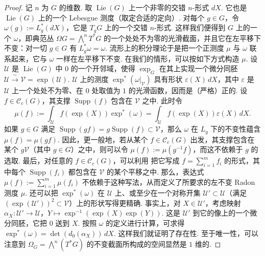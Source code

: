 \begin{proof}
记 $n$ 为 $G$ 的维数. 取 $\operatorname{Lie}(G)$ 上一个非零的交错 $n$-形式 $dX$. 它也是 $\operatorname{Lie}(G)$ 上的一个 Lebesgue 测度（取定合适的定向）. 对每个 $g\in G$，令 $\omega(g):=L_g^{*}(dX)$，它是 $T_gG$ 上的一个交错 $n$-形式. 这样我们便得到 $G$ 上的一个  $\omega$，即典范丛 $\Omega G=\bigwedge^{n}T^{*}G$ 的一个处处不为零的光滑截面，并且它在左平移下不变：对一切 $g\in G$ 有 $L_g^{*}\omega=\omega$. 流形上的积分理论于是把一个正测度 $\mu$ 与 $\omega$ 联系起来，它与 $\omega$ 一样在左平移下不变.
在我们的情形，可以按如下方式构造 $\mu$. 设 $\mathcal U$ 是 $\operatorname{Lie}(G)$ 中 $0$ 的一个开邻域，使得 $\exp_G$ 在其上实现一个微分同胚 $\mathcal U\xrightarrow{\ \sim\ }\mathcal V=\exp(\mathcal U)$. $\mathcal U$ 上的测度 $\exp^{*}(\omega|_{\mathcal V})$ 具有形状 $\varepsilon(X)\,dX$，其中 $\varepsilon$ 是 $\mathcal U$ 上一个处处不为零、在 $0$ 处取值为 $1$ 的光滑函数，因而是（严格）正的. 设 $f\in\mathcal C_c(G)$，其支撑 $\operatorname{Supp}(f)$ 包含在 $\mathcal V$ 之中. 此时令
\[
\mu(f):=\int_{\mathcal U}f(\exp(X))\exp^{*}(\omega)=\int_{\mathcal U}f(\exp(X))\varepsilon(X)\,dX.
\]
如果 $g\in G$ 满足 $\operatorname{Supp}(gf)=g\operatorname{Supp}(f)\subset\mathcal V$，那么 $\omega$ 在 $L_g$ 下的不变性蕴含 $\mu(f)=\mu(gf)$. 因此，更一般地，若从某个 $f\in\mathcal C_c(G)$ 出发，其支撑包含在某个 $g\mathcal V$（其中 $g\in G$）之中，则可以令 $\mu(f):=\mu(g^{-1}f)$，而这不依赖于 $g$ 的选取. 最后，对任意的 $f\in\mathcal C_c(G)$，可以利用  把它写成 $f=\sum_{i=1}^{m}f_i$ 的形式，其中每个 $\operatorname{Supp}(f_i)$ 都包含在 $\mathcal V$ 的某个平移之中. 那么，表达式 $\mu(f):=\sum_{i=1}^{m}\mu(f_i)$ 不依赖于这种写法，从而定义了所要求的左不变 Radon 测度 $\mu$.
还可以把 $\exp^{*}(\omega)$ 在 $\mathcal U$ 上、或至少在一个对称开集 $\mathcal U'\subset\mathcal U$（满足 $(\exp(\mathcal U'))^{2}\subset\mathcal V$）上的形状写得更精确. 事实上，对 $X\in\mathcal U'$，考虑映射 $\alpha_X:\mathcal U'\longrightarrow\mathcal U$，$Y\mapsto\exp^{-1}(\exp(X)\exp(Y))$. 这是 $\mathcal U'$ 到它的像上的一个微分同胚，它把 $0$ 送到 $X$. 按照 $\omega$ 的定义进行计算，可求得 $\exp^{*}(\omega)=\det(d_0(\alpha_X))\,dX$.
这样我们就证明了存在性. 至于唯一性，可以注意到 $\Omega_G=\bigwedge^{n}(T^{*}G)$ 的不变截面所构成的空间显然是 $1$ 维的.
\end{proof}

